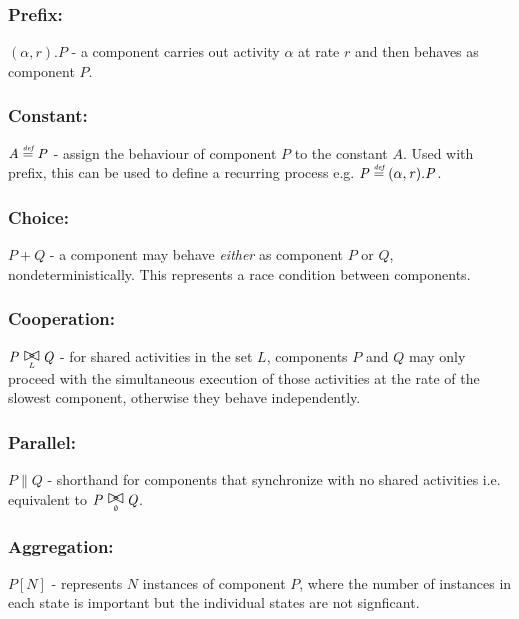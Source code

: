 \subsubsection{Prefix:} $(\mathit{\alpha},\mathit{r}).\mathit{P}$ - a component carries out activity $\mathit{\alpha}$ at rate $\mathit{r}$ and then behaves as component $\mathit{P}$.
\subsubsection{Constant:} $\mathit{A} \stackrel{\mbox{\em {\tiny def}}}{=} \mathit{P}$ - assign the behaviour of component $\mathit{P}$ to the constant $\mathit{A}$.  Used with prefix, this can be used to define a recurring process e.g. $\mathit{P} \stackrel{\mbox{\em {\tiny def}}}{=} (\mathit{\alpha},\mathit{r}).\mathit{P}$.
\subsubsection{Choice:} $\mathit{P} + \mathit{Q}$ - a component may behave {\itshape either} as component $\mathit{P}$ or $\mathit{Q}$, nondeterministically.  This represents a race condition between components.
\subsubsection{Cooperation:} $\mathit{P} \sync{L} \mathit{Q}$ - for shared activities in the set $\mathit{L}$, components $\mathit{P}$ and $\mathit{Q}$ may only proceed with the simultaneous execution of those activities at the rate of the slowest component, otherwise they behave independently.
\subsubsection{Parallel:} $\mathit{P} \parallel \mathit{Q}$ - shorthand for components that synchronize with no shared activities i.e. equivalent to $\mathit{P} \sync{\emptyset} \mathit{Q}$.
\subsubsection{Aggregation:} $\mathit{P}[N]$ - represents $\mathit{N}$ instances of component $\mathit{P}$, where the number of instances in each state is important but the individual states are not signficant.

